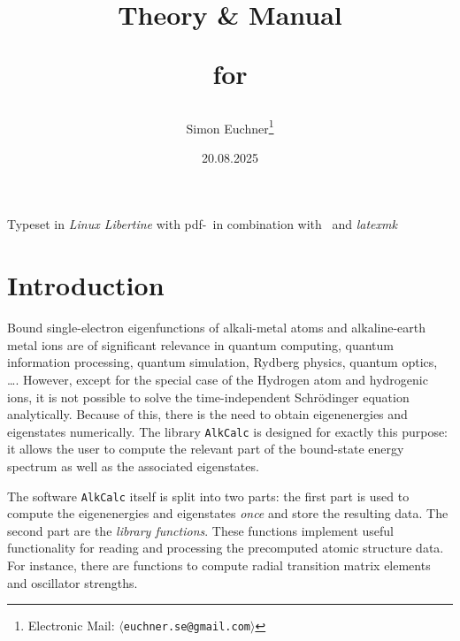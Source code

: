 \documentclass[fontsize=12pt,
               twoside=false,
               BCOR=0mm,
               DIV=14,
               overfullrule=false, %
               toc=bibliography,
               headinclude=true,
               footinclude=false]{scrartcl}
\title{Theory \& Manual\par\vspace*{5mm}for\par\vspace*{5mm}\alkcalc}%
\author{Simon Euchner\footnote{Electronic Mail: %
        $\langle$\texttt{euchner.se@gmail.com}$\rangle$}%
       }
\date{20.08.2025}
\numberwithin{equation}{section}
\newcommand{\alkcalc}{\texttt{AlkCalc} }
\begin{document}
    \renewcommand{\pagemark}{}
    \maketitle%
    \newpage%

    \pagestyle{plain.scrheadings}%


    \def\TOCLineFilling{\xleaders\hbox to.6em{\hfil{\tiny$\circ$\hfil}}\hfil}%

    \DeclareTOCStyleEntry[linefill=\TOCLineFilling]{tocline}{section}%

    \vspace*{2cm}
    \tableofcontents%
    \vfill
    {Typeset in \emph{Linux Libertine} with pdf-\LaTeXe \ in combination with
     \KOMAScript \ and \emph{latexmk}}
    \newpage

    \pagestyle{scrheadings}%
    \setcounter{page}{1}%
    \renewcommand{\pagemark}{\thepage}%

    \section{Introduction}
    \label{sec:introduction}

    Bound single-electron eigenfunctions of alkali-metal atoms and
    alkaline-earth metal ions are of significant relevance in quantum computing,
    quantum information processing, quantum simulation, Rydberg physics, quantum
    optics, \dots. However, except for the special case of the Hydrogen atom and
    hydrogenic ions, it is not possible to solve the time-independent
    Schr\"odinger equation analytically. Because of this, there is the need to
    obtain eigenenergies and eigenstates numerically. The library \alkcalc is
    designed for exactly this purpose: it allows the user to compute the
    relevant part of the bound-state energy spectrum as well as the associated
    eigenstates.

    The software \alkcalc itself is split into two parts: the first part is used
    to compute the eigenenergies and eigenstates \emph{once} and store the
    resulting data. The second part are the \emph{library functions}. These
    functions implement useful functionality for reading and processing the
    precomputed atomic structure data. For instance, there are functions to
    compute radial transition matrix elements and oscillator strengths.
\end{document}
